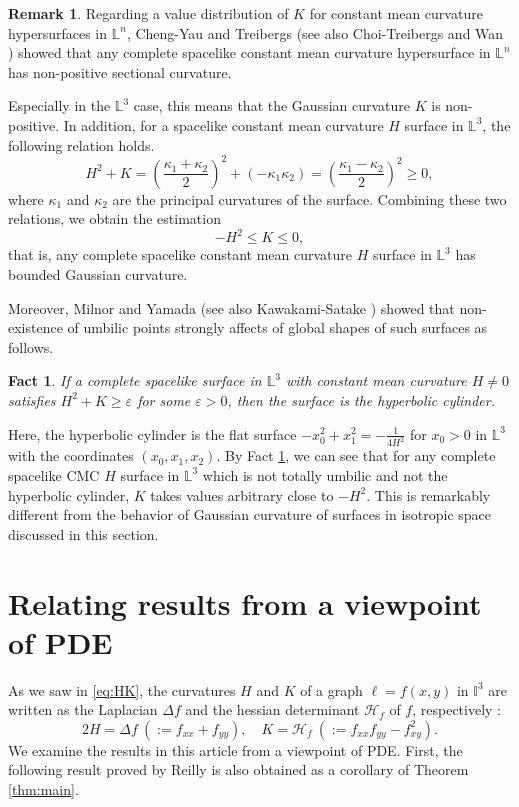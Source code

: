 \documentclass[12pt,a4paper,reqno]{amsart}
\theoremstyle{plain} %
\newtheorem{fact}[theorem]{Fact}
\theoremstyle{definition}
\newtheorem{remark}[theorem]{Remark}
\begin{document}
\begin{remark}
Regarding a value distribution of $K$ for constant mean curvature hypersurfaces in $\mathbb{L}^n$, Cheng-Yau \cite{CY} and Treibergs \cite{T} (see also Choi-Treibergs \cite{CT} and Wan \cite{Wan}) showed that any complete spacelike constant mean curvature  hypersurface in $\mathbb{L}^n$ has non-positive sectional curvature.

Especially in the $\mathbb{L}^3$ case, this means that the Gaussian curvature $K$ is non-positive. In addition, for a spacelike constant mean curvature $H$ surface in $\mathbb{L}^3$, the following relation holds.
	\[
		H^2+K = \left( \frac{\kappa_1+\kappa_2}{2}\right)^2+\left(-\kappa_1\kappa_2 \right) =  \left( \frac{\kappa_1-\kappa_2}{2}\right)^2\geq 0,
	\]
where $\kappa_1$ and $\kappa_2$ are the principal curvatures of the surface.
Combining these two relations, we obtain the estimation
	\[
		-H^2\leq K \leq 0,
	\]
that is, any complete spacelike constant mean curvature $H$ surface in $\mathbb{L}^3$ has bounded Gaussian curvature. 
\end{remark}

Moreover, Milnor \cite{Milnor} and Yamada \cite{Yamada} (see also Kawakami-Satake \cite{KS}) showed that non-existence of umbilic points strongly affects of global shapes of such surfaces as follows.

\begin{fact}\label{fact:inL3}
If a complete spacelike surface in $\mathbb{L}^3$ with constant mean curvature $H\neq 0$ satisfies $H^2 + K\geq  \varepsilon$ for some $\varepsilon>0$, then the surface is the hyperbolic cylinder.
\end{fact}

Here, the hyperbolic cylinder is the flat surface $-x_0^2 +x_1^2 = -\frac{1}{4H^2}$ for $x_0>0$ in $\mathbb{L}^3$ with the coordinates $(x_0,x_1,x_2)$. By Fact \ref{fact:inL3}, we can see that for any complete spacelike CMC $H$ surface in $\mathbb{L}^3$ which is not totally umbilic and not the hyperbolic cylinder, $K$ takes values arbitrary close to $-H^2$. 
This is remarkably different from the behavior of Gaussian curvature of surfaces in isotropic space discussed in this section.


\section{Relating results from a viewpoint of PDE}\label{sec:pde}
As we saw in \eqref{eq:HK}, the curvatures $H$ and $K$ of a graph $\ell=f(x,y)$ in $\mathbb{I}^3$ are written as the Laplacian $\Delta f$ and the hessian determinant $\mathcal{H}_f$ of $f$, respectively :
	\[
		2H=\Delta f\ (:=f_{xx}+f_{yy}),\quad K=\mathcal{H}_f\ (:=f_{xx}f_{yy}-f_{xy}^2).
	\]
We examine the results in this article from a viewpoint of PDE.  
First, the following result proved by Reilly \cite{Reilly} is also obtained as a corollary of Theorem \ref{thm:main}. 
\end{document}
